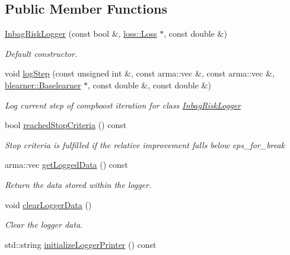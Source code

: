\subsection*{Public Member Functions}
\begin{DoxyCompactItemize}
\item 
\hyperlink{classlogger_1_1_inbag_risk_logger_aab67656c1530f20c29ffed3d54ef8fce}{Inbag\+Risk\+Logger} (const bool \&, \hyperlink{classloss_1_1_loss}{loss\+::\+Loss} $\ast$, const double \&)
\begin{DoxyCompactList}\small\item\em Default constructor. \end{DoxyCompactList}\item 
void \hyperlink{classlogger_1_1_inbag_risk_logger_ad90612e1b684287a29bdbde1077d65d7}{log\+Step} (const unsigned int \&, const arma\+::vec \&, const arma\+::vec \&, \hyperlink{classblearner_1_1_baselearner}{blearner\+::\+Baselearner} $\ast$, const double \&, const double \&)
\begin{DoxyCompactList}\small\item\em Log current step of compboost iteration for class {\ttfamily \hyperlink{classlogger_1_1_inbag_risk_logger}{Inbag\+Risk\+Logger}} \end{DoxyCompactList}\item 
bool \hyperlink{classlogger_1_1_inbag_risk_logger_a17a7416e4cc9db4da3b3eda5012ad7c7}{reached\+Stop\+Criteria} () const
\begin{DoxyCompactList}\small\item\em Stop criteria is fulfilled if the relative improvement falls below {\ttfamily eps\+\_\+for\+\_\+break} \end{DoxyCompactList}\item 
arma\+::vec \hyperlink{classlogger_1_1_inbag_risk_logger_af69f22c25521341a26152692bd03183a}{get\+Logged\+Data} () const
\begin{DoxyCompactList}\small\item\em Return the data stored within the logger. \end{DoxyCompactList}\item 
void \hyperlink{classlogger_1_1_inbag_risk_logger_aecdde2764203ec24ca360846538ce3c6}{clear\+Logger\+Data} ()
\begin{DoxyCompactList}\small\item\em Clear the logger data. \end{DoxyCompactList}\item 
std\+::string \hyperlink{classlogger_1_1_inbag_risk_logger_ab793454f28dae8d0901852b41a910ec7}{initialize\+Logger\+Printer} () const

\end{DoxyCompactItemize}
